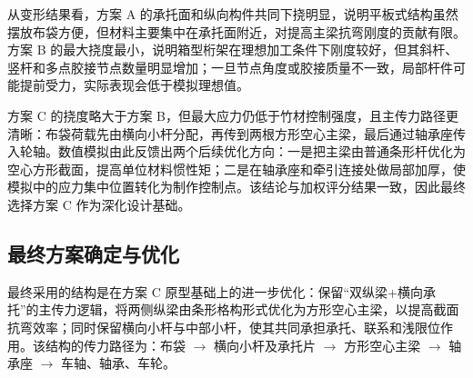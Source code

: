 \documentclass[UTF8,a4paper,12pt,fontset=none]{ctexart}
\numberwithin{equation}{section}
\numberwithin{figure}{section}
\numberwithin{table}{section}
\begin{document}
从变形结果看，方案 A 的承托面和纵向构件共同下挠明显，说明平板式结构虽然摆放布袋方便，但材料主要集中在承托面附近，对提高主梁抗弯刚度的贡献有限。方案 B 的最大挠度最小，说明箱型桁架在理想加工条件下刚度较好，但其斜杆、竖杆和多点胶接节点数量明显增加；一旦节点角度或胶接质量不一致，局部杆件可能提前受力，实际表现会低于模拟理想值。

方案 C 的挠度略大于方案 B，但最大应力仍低于竹材控制强度，且主传力路径更清晰：布袋荷载先由横向小杆分配，再传到两根方形空心主梁，最后通过轴承座传入轮轴。数值模拟由此反馈出两个后续优化方向：一是把主梁由普通条形杆优化为空心方形截面，提高单位材料惯性矩；二是在轴承座和牵引连接处做局部加厚，使模拟中的应力集中位置转化为制作控制点。该结论与加权评分结果一致，因此最终选择方案 C 作为深化设计基础。

\subsection{最终方案确定与优化}
最终采用的结构是在方案 C 原型基础上的进一步优化：保留“双纵梁+横向承托”的主传力逻辑，将两侧纵梁由条形格构形式优化为方形空心主梁，以提高截面抗弯效率；同时保留横向小杆与中部小杆，使其共同承担承托、联系和浅限位作用。该结构的传力路径为：布袋 $\rightarrow$ 横向小杆及承托片 $\rightarrow$ 方形空心主梁 $\rightarrow$ 轴承座 $\rightarrow$ 车轴、轴承、车轮。
\end{document}
